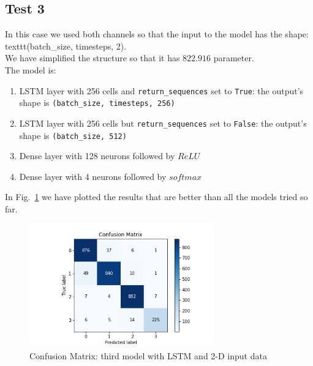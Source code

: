 \documentclass[LaM,binding=0.6cm]{sapthesis}
\begin{document}
\subsection{Test 3}
In this case we used both channels so that the input to the model has the shape: texttt{(batch\_size, timesteps, 2)}.\\We have simplified the structure so that it has $822.916$ parameter.\\The model is:
\begin{enumerate}
\item LSTM layer with 256 cells and \texttt{return\_sequences} set to \texttt{True}: the output's shape is \texttt{(batch\_size, timesteps, 256)} 
\item LSTM layer with 256 cells but \texttt{return\_sequences} set to \texttt{False}: the output's shape is \texttt{(batch\_size, 512)} 
\item Dense layer with 128 neurons followed by $ReLU$
\item Dense layer with 4 neurons followed by $softmax$
\end{enumerate}
In Fig.~\ref{fig:lstmt3} we have plotted the results that are better than all the models tried so far.
\begin{figure}[H]  \centering
    \includegraphics[width=80mm,scale=0.7]{lstmt3}
    \caption{Confusion Matrix: third model with LSTM and 2-D input data}
    \label{fig:lstmt3}
\end{figure}
\end{document}
